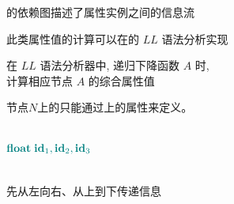 \begin{frame}{}
  \begin{center}
    的依赖图描述了属性实例之间的信息流

    \vspace{0.80cm}
    此类属性值的计算可以在的 $LL$ 语法分析实现

    \pause
    \vspace{0.80cm}
    在 $LL$ 语法分析器中, 递归下降函数 $A$  时, \\[3pt]
    计算相应节点 $A$ 的综合属性值
  \end{center}
\end{frame}

\begin{frame}{}
  \begin{center}
    \begin{definition}
      节点$N$上的只能通过上的属性来定义。
    \end{definition}

    \begin{columns}
        \[
            \textcolor{teal}{\text{\bf float}\; \text{\bf id}_{1}, \text{\bf id}_{2}, \text{\bf id}_{3}}
        \]
    \end{columns}

    \pause
    \vspace{0.30cm}
     先从左向右、从上到下传递信息

  \end{center}
\end{frame}



